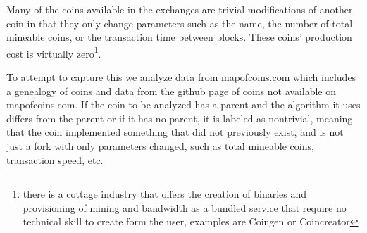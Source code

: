 Many of the coins available in the exchanges are trivial modifications of another coin in that they only change parameters such as the name, the number of total mineable coins, or the transaction time between blocks.
These coins' production cost is virtually zero\footnote{ there is a cottage industry that offers the creation of binaries and provisioning of mining and bandwidth as a bundled service that require no technical skill to create form the user, examples are Coingen or Coincreator}.

To attempt to capture this we analyze data from mapofcoins.com which includes a genealogy of coins and data from the github page of coins not available on mapofcoins.com.
If the coin to be analyzed has a parent and the algorithm it uses differs from the parent or if it has no parent, it is labeled as nontrivial, meaning that the coin implemented something that did not previously exist, and is not just a fork with only parameters changed, such as total mineable coins, transaction speed, etc.
